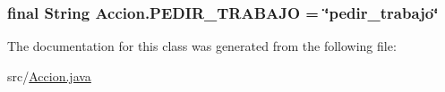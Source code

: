 \subsubsection[{\texorpdfstring{P\+E\+D\+I\+R\+\_\+\+T\+R\+A\+B\+A\+JO}{PEDIR_TRABAJO}}]{\setlength{\rightskip}{0pt plus 5cm}final String Accion.\+P\+E\+D\+I\+R\+\_\+\+T\+R\+A\+B\+A\+JO = \char`\"{}pedir\+\_\+trabajo\char`\"{}\hspace{0.3cm}{\ttfamily [static]}}\hypertarget{classAccion_ad8679a8a5a559e0b470231fc4c98147b}{}\label{classAccion_ad8679a8a5a559e0b470231fc4c98147b}


The documentation for this class was generated from the following file\+:\begin{DoxyCompactItemize}
\item 
src/\hyperlink{Accion_8java}{Accion.\+java}\end{DoxyCompactItemize}
